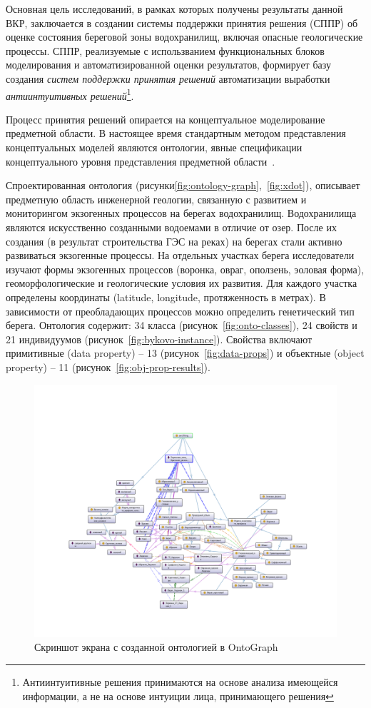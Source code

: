 \documentclass[732,14pt,final]{studrep}
\begin{document}
Основная цель исследований, в рамках которых получены результаты данной ВКР, заключается в создании системы поддержки принятия решения (СППР) об оценке состояния береговой зоны водохранилищ, включая опасные геологические процессы. СППР, реализуемые с использванием функциональных блоков моделирования и автоматизированной оценки результатов, формирует базу создания \emph{систем поддержки принятия решений} автоматизации выработки \emph{антиинтуитивных решений}\footnote{Антиинтуитивные решения принимаются на основе анализа имеющейся информации, а не на основе интуиции лица, принимающего решения}.

Процесс принятия решений опирается на концептуальное моделирование предметной области. В настоящее время стандартным методом представления концептуальных моделей являются онтологии, явные спецификации концептуального уровня представления предметной области~\cite{gruber}.

Спроектированная онтология (рисунки\ref{fig:ontology-graph},~\ref{fig:xdot}), описывает предметную область инженерной геологии, связанную с развитием и мониторингом экзогенных процессов на берегах водохранилищ. Водохранилища являются искусственно созданными водоемами в отличие от озер. После их создания (в результат строительства ГЭС на реках) на берегах стали активно развиваться экзогенные процессы. На отдельных участках берега исследователи изучают формы экзогенных процессов (воронка, овраг, оползень, эоловая форма), геоморфологические и геологические условия их развития. Для каждого участка определены координаты (latitude, longitude, протяженность в метрах). В зависимости от преобладающих процессов можно определить генетический тип берега. Онтология содержит: 34 класса (рисунок~\ref{fig:onto-classes}), 24 свойств и 21 индивидуумов (рисунок~\ref{fig:bykovo-instance}). Свойства включают примитивные (data property) – 13 (рисунок~\ref{fig:data-props}) и объектные (object property) – 11 (рисунок~\ref{fig:obj-prop-results}).

  \begin{figure}[htp]
	\centering
	\includegraphics[width=\linewidth]{pics/image6.png}
    \caption{Скриншот экрана с созданной онтологией в OntoGraph}
    \label{fig:}
  \end{figure}
\end{document}
